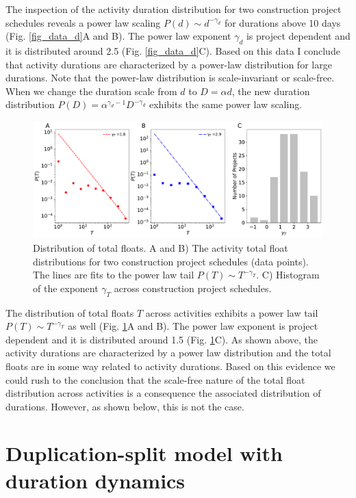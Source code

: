 \documentclass[11pt]{article}
\begin{document}
The inspection of the activity duration distribution for two construction project schedules reveals a power law scaling $P(d)\sim d^{-\gamma_d}$ for durations above 10 days (Fig. \ref{fig_data_d}A and B). The power law exponent $\gamma_d$ is project dependent and it is distributed around 2.5 (Fig. \ref{fig_data_d}C). Based on this data I conclude that activity durations are characterized by a power-law distribution for large durations. Note that the power-law distribution is scale-invariant or scale-free. When we change the duration scale from $d$ to $D = \alpha d$, the new duration distribution $P(D) = \alpha^{\gamma_d-1} D^{-\gamma_d}$ exhibits the same power law scaling.

\begin{figure}[t]
\includegraphics[width=6.3in]{fig_data_T}
\caption{Distribution of total floats. A and B) The activity total float distributions for two construction project schedules (data points). The lines are fits to the power law tail $P(T)\sim T^{-\gamma_T}$. C) Histogram of the exponent $\gamma_T$ across construction project schedules.}
\label{fig_data_T}
\end{figure}

The distribution of total floats $T$ across activities exhibits a power law tail $P(T)\sim T^{-\gamma_T}$ as well (Fig. \ref{fig_data_T}A and B). The power law exponent is project dependent and it is distributed around 1.5 (Fig. \ref{fig_data_T}C). As shown above, the activity durations are characterized by a power law distribution and the total floats are in some way related to activity durations. Based on this evidence we could rush to the conclusion that the scale-free nature of the total float distribution across activities is a consequence the associated distribution of durations. However, as shown below, this is not the case.

\section{Duplication-split model with duration dynamics}
\end{document}
